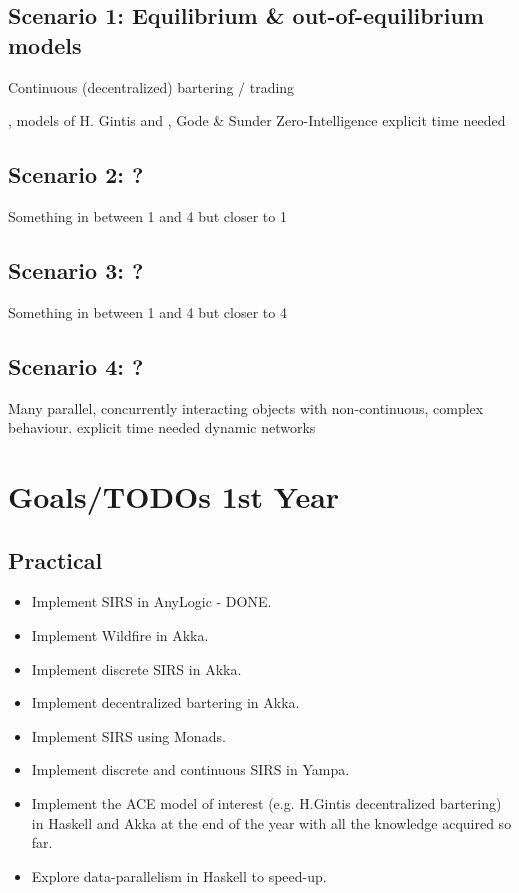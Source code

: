 \documentclass{article}
\begin{document}
\subsection{Scenario 1: Equilibrium \& out-of-equilibrium models}
Continuous (decentralized) bartering / trading

\cite{Botta20114025}, models of H. Gintis \cite{Gintis2006} and \cite{gintis_dynamics_2007} , Gode \& Sunder Zero-Intelligence
explicit time needed

\subsection{Scenario 2: ?}
Something in between 1 and 4 but closer to 1

\subsection{Scenario 3: ?}
Something in between 1 and 4 but closer to 4

\subsection{Scenario 4: ?}
Many parallel, concurrently interacting objects with non-continuous, complex behaviour.
explicit time needed
dynamic networks

\cite{Budish2015}
\cite{aldridge_high_frequency_2009}




\pagebreak

\section{Goals/TODOs 1st Year}
\subsection{Practical}
\begin{itemize}
\item Implement SIRS in AnyLogic - DONE.
\item Implement Wildfire in Akka.
\item Implement discrete SIRS in Akka.
\item Implement decentralized bartering in Akka.
\item Implement SIRS using Monads.
\item Implement discrete and continuous SIRS in Yampa.
\item Implement the ACE model of interest (e.g. H.Gintis decentralized bartering) in Haskell and Akka at the end of the year with all the knowledge acquired so far.
\item Explore data-parallelism in Haskell to speed-up.
\end{itemize}
\end{document}
